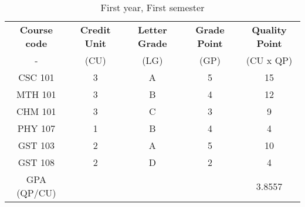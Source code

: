 \documentclass{article}
\begin{document}
	\begin{table}[h!]
		\begin{center}
			\caption{First year, First semester}
			\label{tab:table1}
			\begin{tabular}{c|c|c|c|c|}
				\textbf{Course code} & \textbf{Credit Unit} &
				\textbf{Letter Grade} & \textbf{Grade Point} &
				\textbf{Quality Point}\\
			-	& (CU) & (LG) & (GP) & (CU x QP) \\
			\hline
 			CSC 101 & 3 & A & 5 & 15\\
			MTH 101 & 3 & B & 4 & 12\\
			CHM 101 & 3 & C & 3 & 9\\
			PHY 107 & 1 & B & 4 & 4\\
			GST 103 & 2 & A & 5 & 10\\
			GST 108 & 2 & D & 2 & 4\\
			GPA (QP/CU) & & & & 3.8557\\
		    \end{tabular}	
		\end{center}
	\end{table}
\end{document}
